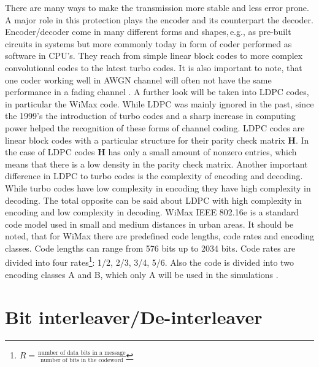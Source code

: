 There are many ways to make the transmission more stable and less error prone. A major role in this protection plays the encoder and its counterpart the decoder. Encoder/decoder come in many different forms and shapes,\,e.g., as pre-built circuits in systems but more commonly today in form of coder performed as software in CPU's. They reach from simple linear block codes to more complex convolutional codes to the latest turbo codes. It is also important to note, that one coder working well in \gls{AWGN} channel will often not have the same performance in a fading channel \cite[p.~262]{Goldsmith08}.
\newline
A further look will be taken into \gls{LDPC} codes, in particular the WiMax code. While \gls{LDPC} was mainly ignored in the past, since the 1999's the introduction of turbo codes and a sharp increase in computing power helped the recognition of these forms of channel coding.
\newline
\gls{LDPC} codes are linear block codes with a particular structure for their parity check matrix \textbf{H}. In the case of \gls{LDPC} codes \textbf{H} has only a small amount of nonzero entries, which means that there is a low density in the parity check matrix.
Another important difference in LDPC to turbo codes is the complexity of encoding and decoding. While turbo codes have low complexity in encoding they have high complexity in decoding. The total opposite can be said about \gls{LDPC} with high complexity in encoding and low complexity in decoding.  
\newline
WiMax IEEE 802.16e is a standard code model used in small and medium distances in urban areas. It should be noted, that for WiMax there are predefined code lengths, code rates and encoding classes. Code lengths can range from 576 bits up to 2034 bits. Code rates are divided into four rates\footnote{$R = \frac{\textrm{number of data bits in a message}}{\textrm{number of bits in the codeword}} $}: 1/2, 2/3, 3/4, 5/6. Also the code is divided into two encoding classes A and B, which only A will be used in the simulations \cite{WIMAX}.
\newpage

\section{Bit interleaver/De-interleaver}
\label{sec:interleaver}

